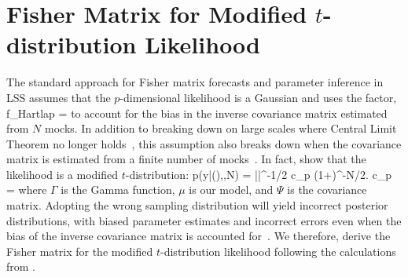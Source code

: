 \section{Fisher Matrix for Modified $t$-distribution Likelihood} \label{sec:tdist}
The standard approach for Fisher matrix forecasts and parameter inference in LSS 
assumes that the $p$-dimensional likelihood is a Gaussian and uses the \cite{hartlap2007} 
factor, 
\beq
f_{\rm Hartlap} = 
\eeq
to account for the bias in the inverse covariance matrix estimated from $N$ mocks.
In addition to breaking down on large scales where Central Limit Theorem no longer 
holds~\citep{hahn2019}, this assumption also breaks down when the covariance matrix 
is estimated from a finite number of mocks~\citep{sellentin2016}. In fact, 
\cite{sellentin2016} show that the likelihood is a modified $t$-distribution: 
\beq \label{eq:tdist_like}
p(y|\mu(\theta),\Psi,N) = |\Psi|^{-1/2} c_p \left(1+\right)^{-N/2}.
\eeq
\beq
c_p = 
\eeq
where $\Gamma$ is the Gamma function, $\mu$ is our model, and $\Psi$ is the covariance 
matrix. Adopting the wrong sampling distribution will yield incorrect posterior distributions, 
with biased parameter estimates and incorrect errors even when the bias of the inverse
covariance matrix is accounted for~\citep{sellentin2016}. We therefore, derive the Fisher
matrix for the modified $t$-distribution likelihood following the calculations from 
\cite{lange1989}. 

